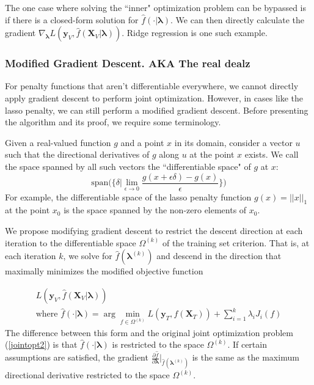 \documentclass[10pt,letterpaper]{article}
\begin{document}
The one case where solving the ``inner" optimization problem can be bypassed is if there is a closed-form solution for $\hat f(\cdot | \boldsymbol{\lambda})$. We can then directly calculate the gradient $\nabla_{\boldsymbol{\lambda}} L(\boldsymbol{y}_V, \hat f(\boldsymbol{X}_V | \boldsymbol{\lambda}))$. Ridge regression is one such example.


\subsubsection{Modified Gradient Descent.  AKA The real dealz}

For penalty functions that aren't differentiable everywhere, we cannot directly apply gradient descent to perform joint optimization. However, in cases like the lasso penalty, we can still perform a modified gradient descent. Before presenting the algorithm and its proof, we require some terminology.

Given a real-valued function $g$ and a point $x$ in its domain, consider a vector $u$ such that the directional derivatives of $g$ along $u$ at the point $x$ exists. We call the space spanned by all such vectors the ``differentiable space" of $g$ at $x$:
\begin{equation}
\text{span} \Big(\{\delta | \lim_{\epsilon \rightarrow 0} \frac{g(x + \epsilon \delta) - g(x)}{\epsilon} \}\Big)
\end{equation}
For example, the differentiable space of the lasso penalty function $g(x) = ||x||_1$ at the point $x_0$ is the space spanned by the non-zero elements of $x_0$.

We propose modifying gradient descent to restrict the descent direction at each iteration to the differentiable space $\Omega^{(k)}$ of the training set criterion. That is, at each iteration $k$, we solve for $\hat f(\boldsymbol{\lambda}^{(k)})$ and descend in the direction that  maximally minimizes the modified objective function

\begin{equation}
\begin{array}{c}
L(\boldsymbol{y}_V, \hat f(\boldsymbol{X}_V | \boldsymbol{\lambda})) \\
\text{where } \hat f(\cdot | \boldsymbol{\lambda}) = \arg \min_{f \in \Omega^{(k)}} L(\boldsymbol{y}_T, f (\boldsymbol{X}_T)) + \sum\limits_{i=1}^k \lambda_i J_i(f)
\end{array}
\end{equation}
The difference between this form and the original joint optimization problem (\ref{jointopt2}) is that $\hat f(\cdot | \boldsymbol{\lambda})$ is restricted to the space $\Omega^{(k)}$. If certain assumptions are satisfied, the gradient $\frac{\partial \hat f}{\partial \boldsymbol{\lambda}}|_{\hat f(\boldsymbol{\lambda}^{(k)})}$ is the same as the maximum directional derivative restricted to the space $\Omega^{(k)}$.
\end{document}
